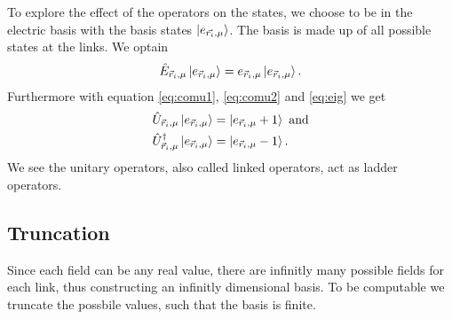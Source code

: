 To explore the effect of the operators on the states, we choose to be in the electric basis with the basis states $\ket{e_{\vec{r_i}, \mu}}$. The basis is made up of all possible states at the links. We optain
\begin{align}
  \hat{E}_{\vec{r}_{i}, \mu}\ket{e_{\vec{r}_{i}, \mu}}=e_{\vec{r}_{i}, \mu}\ket{e_{\vec{r}_{i}, \mu}}.\label{eq:eig}
\end{align}
Furthermore with equation \ref{eq:comu1}, \ref{eq:comu2} and \ref{eq:eig} we get
\begin{align}
  \hat{U}_{\vec{r}_{i}, \mu}\ket{e_{\vec{r}_{i}, \mu}}      & =\ket{e_{\vec{r}_{i}, \mu}+1}\text{ and}\label{eq:eigu1} \\
  \hat{U}_{\vec{r}_{i}, \mu}^\dag\ket{e_{\vec{r}_{i}, \mu}} & =\ket{e_{\vec{r}_{i}, \mu}-1}.\label{eq:eigu2}
\end{align}
We see the unitary operators, also called linked operators, act as ladder operators.
\subsection{Truncation}
Since each field can be any real value, there are infinitly many possible fields for each link, thus constructing an infinitly dimensional basis. To be computable we truncate the possbile values, such that the basis is finite.

